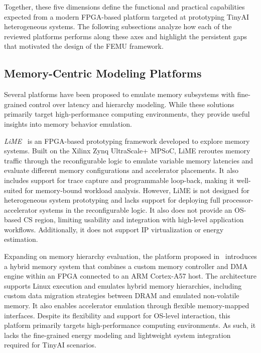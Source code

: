         Together, these five dimensions define the functional and practical capabilities expected from a modern FPGA-based platform targeted at prototyping TinyAI heterogeneous systems. The following subsections analyze how each of the reviewed platforms performs along these axes and highlight the persistent gaps that motivated the design of the \mbox{FEMU} framework.
        
        \subsection{Memory-Centric Modeling Platforms}
        
            Several platforms have been proposed to emulate memory subsystems with fine-grained control over latency and hierarchy modeling. While these solutions primarily target high-performance computing environments, they provide useful insights into memory behavior emulation.
            
            \emph{LiME}~\cite{lime} is an FPGA-based prototyping framework developed to explore memory systems. Built on the Xilinx Zynq UltraScale+ MPSoC, LiME reroutes memory traffic through the reconfigurable logic to emulate variable memory latencies and evaluate different memory configurations and accelerator placements. It also includes support for trace capture and programmable loop-back, making it well-suited for memory-bound workload analysis. However, LiME is not designed for heterogeneous system prototyping and lacks support for deploying full processor-accelerator systems in the reconfigurable logic. It also does not provide an OS-based CS region, limiting usability and integration with high-level application workflows. Additionally, it does not support IP virtualization or energy estimation.
            
            Expanding on memory hierarchy evaluation, the platform proposed in~\cite{hybrid} introduces a hybrid memory system that combines a custom memory controller and DMA engine within an FPGA connected to an ARM Cortex-A57 host. The architecture supports Linux execution and emulates hybrid memory hierarchies, including custom data migration strategies between DRAM and emulated non-volatile memory. It also enables accelerator emulation through flexible memory-mapped interfaces. Despite its flexibility and support for OS-level interaction, this platform primarily targets high-performance computing environments. As such, it lacks the fine-grained energy modeling and lightweight system integration required for TinyAI scenarios.
            
